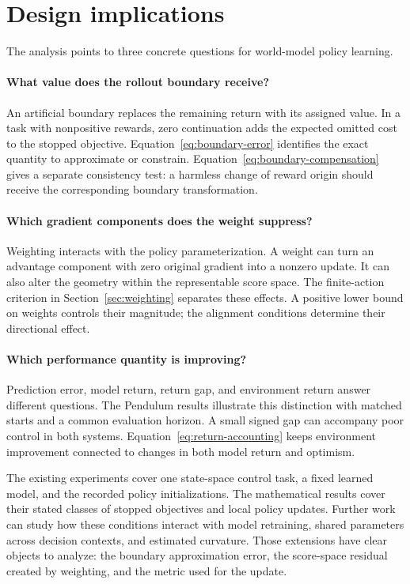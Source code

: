 \section{Design implications}
\label{sec:discussion}

The analysis points to three concrete questions for world-model policy learning.

\paragraph{What value does the rollout boundary receive?}
An artificial boundary replaces the remaining return with its assigned value. In a task with nonpositive rewards, zero continuation adds the expected omitted cost to the stopped objective. Equation~\eqref{eq:boundary-error} identifies the exact quantity to approximate or constrain. Equation~\eqref{eq:boundary-compensation} gives a separate consistency test: a harmless change of reward origin should receive the corresponding boundary transformation.

\paragraph{Which gradient components does the weight suppress?}
Weighting interacts with the policy parameterization. A weight can turn an advantage component with zero original gradient into a nonzero update. It can also alter the geometry within the representable score space. The finite-action criterion in Section~\ref{sec:weighting} separates these effects. A positive lower bound on weights controls their magnitude; the alignment conditions determine their directional effect.

\paragraph{Which performance quantity is improving?}
Prediction error, model return, return gap, and environment return answer different questions. The Pendulum results illustrate this distinction with matched starts and a common evaluation horizon. A small signed gap can accompany poor control in both systems. Equation~\eqref{eq:return-accounting} keeps environment improvement connected to changes in both model return and optimism.

The existing experiments cover one state-space control task, a fixed learned model, and the recorded policy initializations. The mathematical results cover their stated classes of stopped objectives and local policy updates. Further work can study how these conditions interact with model retraining, shared parameters across decision contexts, and estimated curvature. Those extensions have clear objects to analyze: the boundary approximation error, the score-space residual created by weighting, and the metric used for the update.

